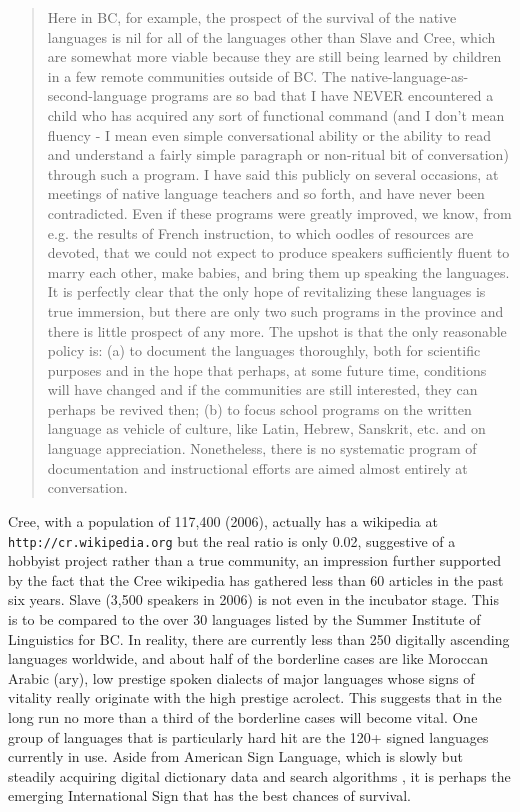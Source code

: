 \documentclass[10pt]{article}
\begin{document}
\begin{quote}
Here in BC, for example, the prospect of the survival of the native languages
is nil for all of the languages other than Slave and Cree, which are somewhat
more viable because they are still being learned by children in a few remote
communities outside of BC. The native-language-as-second-language programs are
so bad that I have NEVER encountered a child who has acquired any sort of
functional command (and I don't mean fluency - I mean even simple
conversational ability or the ability to read and understand a fairly simple
paragraph or non-ritual bit of conversation) through such a program. I have
said this publicly on several occasions, at meetings of native language
teachers and so forth, and have never been contradicted. Even if these
programs were greatly improved, we know, from e.g. the results of French
instruction, to which oodles of resources are devoted, that we could not
expect to produce speakers sufficiently fluent to marry each other, make
babies, and bring them up speaking the languages. It is perfectly clear that
the only hope of revitalizing these languages is true immersion, but there are
only two such programs in the province and there is little prospect of any
more.  The upshot is that the only reasonable policy is: (a) to document the
languages thoroughly, both for scientific purposes and in the hope that
perhaps, at some future time, conditions will have changed and if the
communities are still interested, they can perhaps be revived then; (b) to
focus school programs on the written language as vehicle of culture, like
Latin, Hebrew, Sanskrit, etc. and on language appreciation. Nonetheless, there
is no systematic program of documentation and instructional efforts are aimed
almost entirely at conversation.
\end{quote}

\noindent
Cree, with a population of 117,400 (2006), actually has a wikipedia at {\tt
  http://cr.wikipedia.org} but the real ratio is only 0.02, suggestive of a
hobbyist project rather than a true community, an impression further supported
by the fact that the Cree wikipedia has gathered less than 60 articles in the
past six years. Slave (3,500 speakers in 2006) is not even in the incubator
stage. This is to be compared to the over 30 languages listed by the Summer
Institute of Linguistics for BC.  In reality, there are currently less than
250 digitally ascending languages worldwide, and {\color{black} about half of
  the borderline cases are like Moroccan Arabic (ary), low prestige spoken
  dialects of major languages whose signs of vitality really originate with
  the high prestige acrolect. This suggests that in the long run no more} than
a third of the borderline cases will become vital. One group of languages that
is particularly hard hit are the 120+ signed languages currently in use. Aside
from American Sign Language, which is slowly but steadily acquiring digital
dictionary data and search algorithms \cite{Thangali:2011},
it is perhaps the emerging International Sign \cite{Hiddinga:2011}
that has the best chances of survival. 
\end{document}
